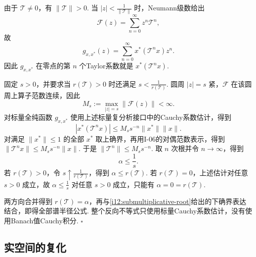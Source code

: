 \begin{FAProof}
由于 \(\displaystyle \mathcal T\neq0\)，有 \(\displaystyle \|\mathcal T\|>0\). 当 \(\displaystyle |z|<\frac{1}{\|\mathcal T\|}\) 时，Neumann级数给出
\[
\mathcal F(z)
=
\sum_{n=0}^{\infty}z^n\mathcal T^n,
\]
故
\[
g_{x,x^*}(z)
=
\sum_{n=0}^{\infty}x^*(\mathcal T^n x)z^n.
\]
因此 \(\displaystyle g_{x,x^*}\) 在零点的第 \(\displaystyle n\) 个Taylor系数就是 \(\displaystyle x^*(\mathcal T^n x)\).

固定 \(\displaystyle s>0\)，并要求当 \(\displaystyle r(\mathcal T)>0\) 时还满足 \(\displaystyle s<\frac{1}{r(\mathcal T)}\). 圆周 \(\displaystyle |z|=s\) 紧，\(\displaystyle \mathcal F\) 在该圆周上算子范数连续，因此
\[
M_s
:=
\max_{|z|=s}\|\mathcal F(z)\|
<\infty.
\]
对标量全纯函数 \(\displaystyle g_{x,x^*}\) 使用上述标量复分析接口中的Cauchy系数估计，得到
\[
|x^*(\mathcal T^n x)| \leqslant M_s s^{-n}\|x^*\|\|x\|.
\]
对满足 \(\displaystyle \|x^*\|\leqslant1\) 的全部 \(\displaystyle x^*\) 取上确界，再用I-06的对偶范数表示，得到
\(\displaystyle \|\mathcal T^n x\| \leqslant M_s s^{-n}\|x\|\).
于是
\(\displaystyle \|\mathcal T^n\| \leqslant M_s s^{-n}\).
取 \(\displaystyle n\) 次根并令 \(\displaystyle n\to\infty\)，得到
\[
\alpha
\leqslant
\frac{1}{s}.
\]
若 \(\displaystyle r(\mathcal T)>0\)，令 \(\displaystyle s\uparrow\frac{1}{r(\mathcal T)}\)，得到 \(\displaystyle \alpha\leqslant r(\mathcal T)\). 若 \(\displaystyle r(\mathcal T)=0\)，上述估计对任意 \(\displaystyle s>0\) 成立，故 \(\displaystyle \alpha\leqslant\frac{1}{s}\) 对任意 \(\displaystyle s>0\) 成立，只能有 \(\displaystyle \alpha=0=r(\mathcal T)\).

两方向合并得到 \(\displaystyle r(\mathcal T)=\alpha\)，再与\autoref{i12:submultiplicative-root}给出的下确界表达结合，即得全部谱半径公式. 整个反向不等式只使用标量Cauchy系数估计，没有使用Banach值Cauchy积分.
\hfill\(\square\)
\end{FAProof}

\subsection{实空间的复化}\label{subsec:i12-complexification}

